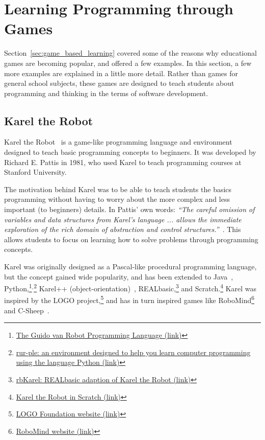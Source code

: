 \section{Learning Programming through Games}
\label{sec:learning_with_games}
Section~\ref{sec:game_based_learning} covered some of the reasons why educational games are becoming popular, and offered a few examples. In this section, a few more examples are explained in a little more detail. Rather than games for general school subjects, these games are designed to teach students about programming and thinking in the terms of software development.

\subsection{Karel the Robot}
\label{sec:karel_the_robot}
Karel the Robot~\cite{pattis:karel_the_robot} is a game-like programming language and environment designed to teach basic programming concepts to beginners. It was developed by Richard E. Pattis in 1981, who used Karel to teach programming courses at Stanford University.

\noindent
The motivation behind Karel was to be able to teach students the basics programming without having to worry about the more complex and less important (to beginners) details. In Pattis' own words: \emph{``The careful omission of variables and data structures from Karel's language ... allows the immediate exploration of the rich domain of abstraction and control structures.''}~\cite{pattis:karel_the_robot}. This allows students to focus on learning how to solve problems through programming concepts.

\noindent
Karel was originally designed as a Pascal-like procedural programming language, but the concept gained wide popularity, and has been extended to Java~\cite{roberts:karel_the_robot_java},
Python,\footnote{\href{http://gvr.sourceforge.net/}{The Guido van Robot
Programming Language (link)}}$^{,}$\footnote{\href{https://code.google.com/p/rur-ple/}{rur-ple: an environment designed to help you learn computer programming using the language Python (link)}} Karel++ (object-orientation)~\cite{bergin:karel_plus_plus}, REALbasic,\footnote{\href{https://code.google.com/p/rbstuff/wiki/rbKarelOverview}{rbKarel:
REALbasic adaption of Karel the Robot (link)}} and Scratch.\footnote{\href{http://scratched.media.mit.edu/resources/karel-robot-scratch}{Karel the Robot in Scratch (link)}} Karel was inspired by the LOGO project,\footnote{\href{http://el.media.mit.edu/logo-foundation/index.html}{LOGO Foundation website (link)}} and has in turn inspired games like RoboMind\footnote{\href{http://www.robomind.net/en/index.html}{RoboMind website (link)}} and C-Sheep~\cite{anderson:c-sheep}.

